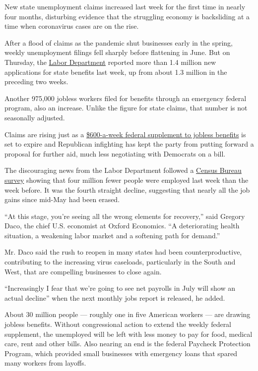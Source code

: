 New state unemployment claims increased last week for the first time in
nearly four months, disturbing evidence that the struggling economy is
backsliding at a time when coronavirus cases are on the rise.

After a flood of claims as the pandemic shut businesses early in the
spring, weekly unemployment filings fell sharply before flattening in
June. But on Thursday, the
\href{https://oui.doleta.gov/press/2020/072320.pdf}{Labor Department}
reported more than 1.4 million new applications for state benefits last
week, up from about 1.3 million in the preceding two weeks.

Another 975,000 jobless workers filed for benefits through an emergency
federal program, also an increase. Unlike the figure for state claims,
that number is not seasonally adjusted.

Claims are rising just as a
\href{https://www.nytimes3xbfgragh.onion/2020/07/30/business/unemployment-payments-change.html}{\$600-a-week
federal supplement to jobless benefits} is set to expire and Republican
infighting has kept the party from putting forward a proposal for
further aid, much less negotiating with Democrats on a bill.

The discouraging news from the Labor Department followed a
\href{https://www.census.gov/householdpulsedata}{Census Bureau survey}
showing that four million fewer people were employed last week than the
week before. It was the fourth straight decline, suggesting that nearly
all the job gains since mid-May had been erased.

``At this stage, you're seeing all the wrong elements for recovery,''
said Gregory Daco, the chief U.S. economist at Oxford Economics. ``A
deteriorating health situation, a weakening labor market and a softening
path for demand.''

Mr. Daco said the rush to reopen in many states had been
counterproductive, contributing to the increasing virus caseloads,
particularly in the South and West, that are compelling businesses to
close again.

``Increasingly I fear that we're going to see net payrolls in July will
show an actual decline'' when the next monthly jobs report is released,
he added.

About 30 million people --- roughly one in five American workers --- are
drawing jobless benefits. Without congressional action to extend the
weekly federal supplement, the unemployed will be left with less money
to pay for food, medical care, rent and other bills. Also nearing an end
is the federal Paycheck Protection Program, which provided small
businesses with emergency loans that spared many workers from layoffs.

